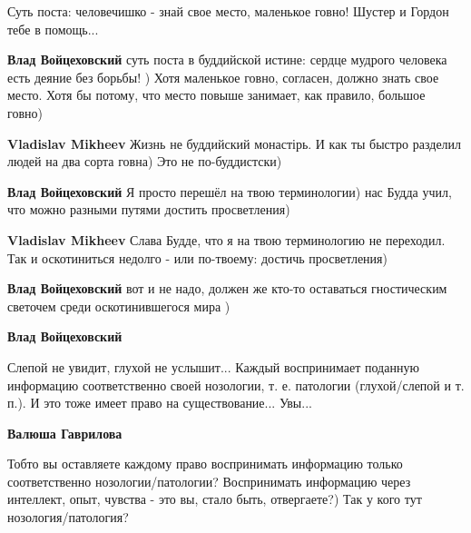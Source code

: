  
 
 
 
 
\zzSecCmt

\begin{itemize} %

Суть поста: человечишко - знай свое место, маленькое говно! Шустер и Гордон
тебе в помощь...

\begin{itemize} %
\textbf{Влад Войцеховский} суть поста в буддийской истине: сердце мудрого человека есть деяние без борьбы! )
Хотя маленькое говно, согласен, должно знать свое место. Хотя бы потому, что место повыше занимает, как правило, большое говно)

\textbf{Vladislav Mikheev} Жизнь не буддийский монастірь. И как ты быстро разделил людей на два сорта говна) Это не по-буддистски)

\textbf{Влад Войцеховский}
Я просто перешёл на твою терминологии) нас Будда учил, что можно разными путями достить просветления)

\textbf{Vladislav Mikheev} Слава Будде, что я на твою терминологию не переходил. Так и оскотиниться недолго - или по-твоему: достичь просветления)

\textbf{Влад Войцеховский} вот и не надо, должен же кто-то оставаться гностическим светочем среди оскотинившегося мира )

\textbf{Влад Войцеховский} 

Слепой не увидит, глухой не услышит... Каждый воспринимает поданную информацию
соответственно своей нозологии, т. е. патологии (глухой/слепой и т. п.). И это
тоже имеет право на существование... Увы...

\textbf{Валюша Гаврилова} 

Тобто вы оставляете каждому право воспринимать информацию только соответственно
нозологии/патологии? Воспринимать информацию через интеллект, опыт, чувства -
это вы, стало быть, отвергаете?) Так у кого тут нозология/патология?


\end{itemize}
\end{itemize}
